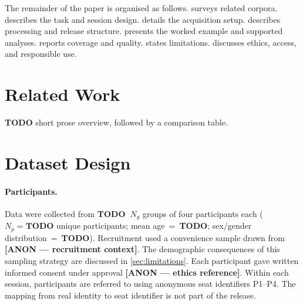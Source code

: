 \documentclass{article}
\begin{document}
The remainder of the paper is organised as follows.
 surveys related corpora.
 describes the task and session design.
 details the acquisition setup.
 describes processing and release structure.
 presents the worked example and supported analyses.
 reports coverage and quality.
 states limitations.
 discusses ethics, access, and responsible use.

\section{Related Work}
\label{sec:related}

%
%

\textbf{TODO} short prose overview, followed by a comparison table.
% 

\section{Dataset Design}
\label{sec:design}

\paragraph{Participants.}
Data were collected from \textbf{TODO~$N_g$} groups of four participants each
($N_p=\textbf{TODO}$ unique participants;
mean age~=~\textbf{TODO};
sex/gender distribution~=~\textbf{TODO}).
Recruitment used a convenience sample drawn from
\textbf{[ANON --- recruitment context]}.
The demographic consequences of this sampling strategy are discussed in
\cref{sec:limitations}.
Each participant gave written informed consent under approval
\textbf{[ANON --- ethics reference]}.
Within each session, participants are referred to using anonymous seat
identifiers P1--P4.
The mapping from real identity to seat identifier is not part of the release.
\end{document}
